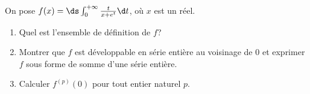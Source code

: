 \begin{enonce}
\begin{exercise}[ID={RMS127 E752},subtitle={Mines-Ponts PSI 2016},tags={}, difficulty={0}]
  On pose $f(x)=\ds\int_0^{+\infty} \frac{t}{x+e^t} \d t$, où $x$ est un réel.

  \begin{enumerate}
    \item Quel est l'ensemble de définition de $f$?
    \item Montrer que $f$ est développable en série entière au voisinage de $0$ et exprimer $f$ sous forme de somme d'une série entière.
    \item Calculer $f^{(p)}(0)$ pour tout entier naturel $p$.  
  \end{enumerate}
\end{exercise}
\begin{solution}
\end{solution}
\end{enonce}
